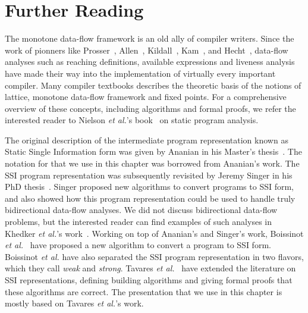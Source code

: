 {\section{Further Reading}

The monotone data-flow framework is an old ally of compiler writers.
Since the work of pionners like Prosser~\cite{Prosser59}, Allen~\cite{Allen70,Allen76}, Kildall~\cite{Kildall73}, Kam~\cite{Kam77}, and Hecht~\cite{Hecht77}, data-flow analyses such as reaching definitions, available expressions and liveness analysis have made their way into the implementation of virtually every important compiler.
Many compiler textbooks describes the theoretic basis of the notions of lattice, monotone data-flow framework and fixed points.
For a comprehensive overview of these concepts, including algorithms and formal proofs, we refer the interested reader to Nielson {\em et al.}'s book~\cite{Nielson05} on static program analysis.

The original description of the intermediate program representation known as Static Single Information form was given by Ananian in his Master's thesis~\cite{Ananian99}.
The notation for \sigmafuns that we use in this chapter was borrowed from Ananian's work.
The SSI program representation was subsequently revisited by Jeremy Singer in his PhD thesis~\cite{Singer06}.
Singer proposed new algorithms to convert programs to SSI form, and also showed how this program representation could be used to handle truly bidirectional data-flow analyses.
We did not discuss bidirectional data-flow problems, but the interested reader can find examples of such analyses in Khedker {\em et al.}'s work~\cite{Khedker99}.
Working on top of Ananian's and Singer's work, Boissinot {\em et al.}~\cite{BoissinotBDR12} have proposed a new algorithm to convert a program to SSI form.
Boissinot {\em et al.} have also separated the SSI program representation in two flavors, which they call {\em weak} and {\em strong}.
Tavares {\em et al.}~\cite{Tavares11b} have extended the literature on SSI representations, defining building algorithms and giving formal proofs that these algorithms are correct.
The presentation that we use in this chapter is mostly based on Tavares {\em et
al.}'s work.

}
